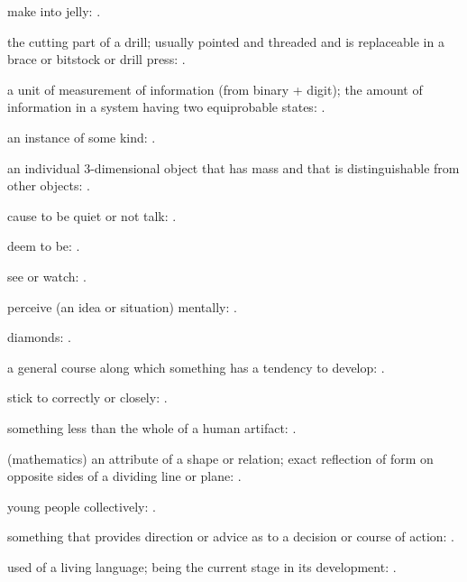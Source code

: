   make into jelly:   .

  the cutting part of a drill; usually pointed and threaded and is replaceable in a brace or bitstock or drill press: .

  a unit of measurement of information (from binary + digit); the amount of information in a system having two equiprobable states: .

  an instance of some kind:   .

  an individual 3-dimensional object that has mass and that is distinguishable from other objects: .

  cause to be quiet or not talk:   .

  deem to be:   .

  see or watch:   .

  perceive (an idea or situation) mentally:   .

  diamonds:   .

  a general course along which something has a tendency to develop: .

  stick to correctly or closely:   .

  something less than the whole of a human artifact:   .

  (mathematics) an attribute of a shape or relation; exact reflection of form on opposite sides of a dividing line or plane:   .

  young people collectively:   .

  something that provides direction or advice as to a decision or course of action:   .

  used of a living language; being the current stage in its development:   .

